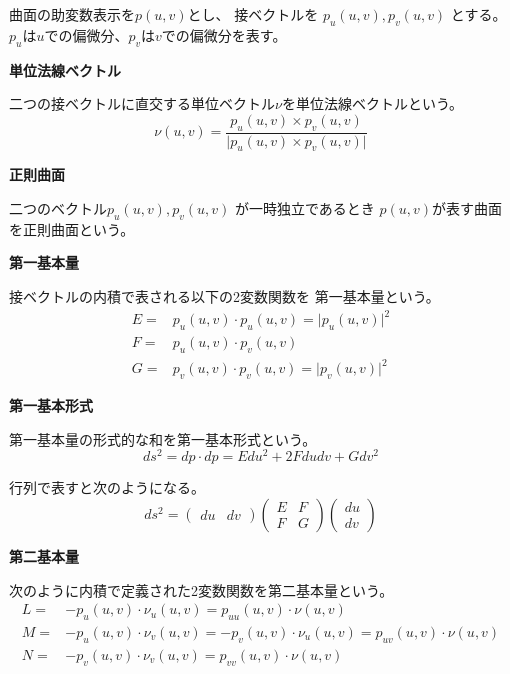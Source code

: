 \documentclass[12pt,b5paper]{ltjsarticle}
\begin{document}
曲面の助変数表示を$p(u,v)$とし、
接ベクトルを
$p_{u}(u,v),p_{v}(u,v)$
とする。
$p_u$は$u$での偏微分、$p_v$は$v$での偏微分を表す。


\textbf{単位法線ベクトル}

二つの接ベクトルに直交する単位ベクトル$\nu$を単位法線ベクトルという。
\begin{equation}
 \nu(u,v)=
  \frac{p_{u}(u,v) \times p_{v}(u,v)}
  {\lvert p_{u}(u,v) \times p_{v}(u,v) \rvert}
\end{equation}

\textbf{正則曲面}

二つのベクトル$p_{u}(u,v),p_{v}(u,v)$
が一時独立であるとき
$p(u,v)$が表す曲面を正則曲面という。


\textbf{第一基本量}

接ベクトルの内積で表される以下の2変数関数を
第一基本量という。
\begin{align}
 E =& p_{u}(u,v) \cdot p_{u}(u,v) = \lvert p_{u}(u,v) \rvert^2
  \\
 F =& p_{u}(u,v) \cdot p_{v}(u,v)
  \\
 G =& p_{v}(u,v) \cdot p_{v}(u,v) = \lvert p_{v}(u,v) \rvert^2
\end{align}


\textbf{第一基本形式}

第一基本量の形式的な和を第一基本形式という。
\begin{equation}
 ds^2 = dp \cdot dp = E du^2 + 2F dudv + G dv^2
\end{equation}

行列で表すと次のようになる。
\begin{equation}
 ds^2 =
  \begin{pmatrix}
   du & dv
  \end{pmatrix}
  \begin{pmatrix}
   E & F \\
   F & G
  \end{pmatrix}
  \begin{pmatrix}
   du \\ dv
  \end{pmatrix}
\end{equation}


\textbf{第二基本量}

次のように内積で定義された2変数関数を第二基本量という。
\begin{align}
 L =& - p_{u}(u,v) \cdot \nu_{u}(u,v) = p_{uu}(u,v) \cdot \nu(u,v)
  \\
 M =& - p_{u}(u,v) \cdot \nu_{v}(u,v) = - p_{v}(u,v) \cdot \nu_{u}(u,v) = p_{uv}(u,v) \cdot \nu(u,v)
  \\
 N =&  - p_{v}(u,v) \cdot \nu_{v}(u,v) = p_{vv}(u,v) \cdot \nu(u,v)
\end{align}
\end{document}
